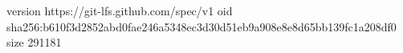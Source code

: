 version https://git-lfs.github.com/spec/v1
oid sha256:b610f3d2852abd0fae246a5348ec3d30d51eb9a908e8e8d65bb139fc1a208df0
size 291181
